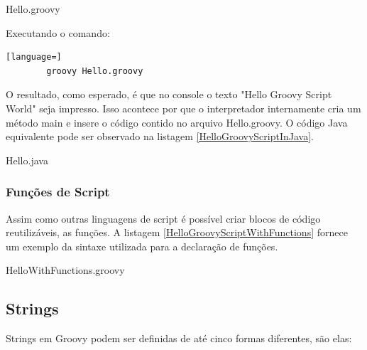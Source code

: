 \documentclass[12pt]{article}
\begin{document}
    
                    {Hello.groovy}

    Executando o comando:
    \begin{lstlisting}[language=]
        groovy Hello.groovy
    \end{lstlisting}
    
    O resultado, como esperado, é que no console o texto "Hello Groovy Script World"
    seja impresso. Isso acontece por que o interpretador internamente cria um 
    método main e insere o código contido no arquivo Hello.groovy. O código Java
    equivalente pode ser observado na listagem \ref{HelloGroovyScriptInJava}.
    
    
                    {Hello.java}

\subsubsection{Funções de Script}

    Assim como outras linguagens de script é possível criar blocos de código 
    reutilizáveis, as funções. A listagem \ref{HelloGroovyScriptWithFunctions} 
    fornece um exemplo da sintaxe utilizada para a declaração de funções.
    
    
                    {HelloWithFunctions.groovy}
   

\subsection{Strings}

    Strings em Groovy podem ser definidas de até cinco formas diferentes, são elas:
    
\end{document}
